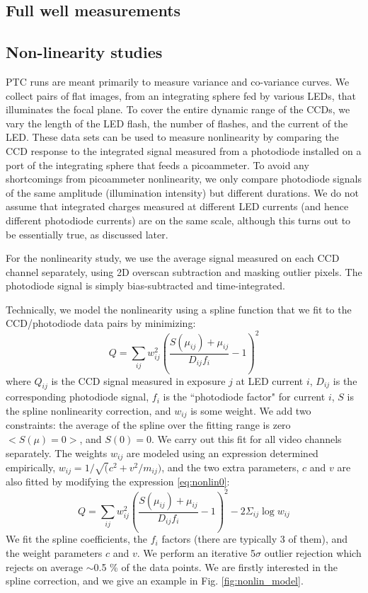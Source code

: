 \subsection{Full well measurements}\label{fullwell}

\subsection{Non-linearity studies}\label{nonlinearity}
PTC runs are meant primarily to measure variance and co-variance curves. We collect pairs of flat images, from an integrating sphere fed by various LEDs, that  illuminates the focal plane. To cover the entire dynamic range of the CCDs, we vary the length of the LED flash, the number of flashes, and the current of the LED. These data sets can be used to measure nonlinearity by comparing the CCD response to the integrated signal measured from a photodiode installed on a port of the integrating sphere that feeds a picoammeter. To avoid any shortcomings from picoammeter nonlinearity, we only compare photodiode signals of the same amplitude (illumination intensity) but different durations. We do not assume that integrated charges measured at different LED currents (and hence different photodiode currents) are on the same scale, although this turns out to be essentially true, as discussed later. 

For the nonlinearity study, we use the average signal measured on each CCD channel separately, using 2D overscan subtraction and masking outlier pixels. The photodiode signal is simply bias-subtracted and time-integrated. 

Technically, we model the nonlinearity using a spline function that we fit to the CCD/photodiode data pairs by minimizing:
\begin{equation}
Q = \sum_{ij} w_{ij}^2 \left( \frac{ S(\mu_{ij}) +\mu_{ij}  }{D_{ij} f_i} -1 \right)^2
\label{eq:nonlin0}
\end{equation}
where $Q_{ij}$ is the CCD signal measured in exposure $j$ at LED current $i$,
$D_{ij}$ is the corresponding photodiode signal, $f_i$ is the ``photodiode factor" for current $i$, $S$ is the spline nonlinearity correction, and $w_{ij}$ is some weight. We add two constraints: the average of the spline over the fitting range is zero $<S(\mu)=0>$, and $S(0) = 0$. We carry out this fit for all video channels separately. The weights $w_{ij}$ are modeled using an expression determined empirically, $w_{ij} = 1/\sqrt(c^2+v^2/m_{ij})$, and the two extra parameters, $c$ and $v$ are also fitted by modifying the expression \ref{eq:nonlin0}:
\begin{equation}
Q = \sum_{ij} w_{ij}^2 \left( \frac{ S(\mu_{ij}) +\mu_{ij}  }{D_{ij} f_i} -1 \right)^2 - 2 \Sigma_{ij} \log w_{ij}
\label{eq:nonlin1}
\end{equation}
We fit the spline coefficients, the $f_i$ factors (there are typically 3 of them), and the weight parameters $c$ and $v$. We perform an iterative 5$\sigma$ outlier rejection which rejects on average $\sim $0.5 \% of the data points.  
We are firstly interested in the spline correction, and we give an example in Fig. \ref{fig:nonlin_model}.

